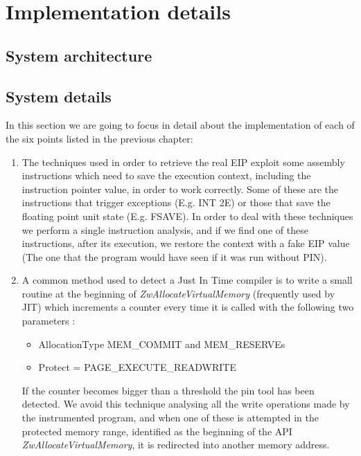 \chapter{Implementation details}
\label{chapter4}
\thispagestyle{empty}

\section{System architecture}

\section{System details}
In this section we are going to focus in detail about the implementation of each of the six points listed in the previous chapter:
\begin{enumerate}

\item The techniques used in order to retrieve the real EIP exploit some assembly instructions which need to save the execution context, including the instruction pointer value, in order to work correctly. Some of these are the instructions that trigger exceptions (E.g. INT 2E) or those that save the floating point unit state (E.g. FSAVE). In order to deal with these techniques we perform a single instruction analysis, and if we find one of these instructions, after its execution, we restore the context with a fake EIP value (The one that the program would have seen if it was run without PIN).

\item A common method used to detect a Just In Time compiler is to write a small routine at the beginning of \textit{ZwAllocateVirtualMemory} (frequently used by JIT) which increments a counter every time it is called with the following two parameters : 

\begin{itemize}
\item AllocationType MEM\_COMMIT and MEM\_RESERVEs

\item Protect = PAGE\_EXECUTE\_READWRITE
\end{itemize}

If the counter becomes bigger than a threshold the pin tool has been detected. We avoid this technique analysing all the write operations made by the instrumented program, and when one of these is attempted in the protected memory range, identified as the beginning of the API \textit{ZwAllocateVirtualMemory}, it is redirected into another memory address.


\end{enumerate}
